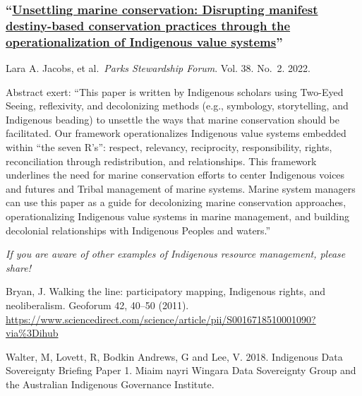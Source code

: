 \documentclass[
]{book}
\begin{document}
\hypertarget{unsettling-marine-conservation-disrupting-manifest-destiny-based-conservation-practices-through-the-operationalization-of-indigenous-value-systems}{%
\subsubsection*{\texorpdfstring{``\href{(https://escholarship.org/uc/item/3sm1f1vq)}{Unsettling marine conservation: Disrupting manifest destiny-based conservation practices through the operationalization of Indigenous value systems}''}{``Unsettling marine conservation: Disrupting manifest destiny-based conservation practices through the operationalization of Indigenous value systems''}}\label{unsettling-marine-conservation-disrupting-manifest-destiny-based-conservation-practices-through-the-operationalization-of-indigenous-value-systems}}

Lara A. Jacobs, et al.~\emph{Parks Stewardship Forum}. Vol. 38. No.~2. 2022.

Abstract exert: ``This paper is written by Indigenous scholars using Two-Eyed Seeing, reflexivity, and decolonizing methods (e.g., symbology, storytelling, and Indigenous beading) to unsettle the ways that marine conservation should be facilitated. Our framework operationalizes Indigenous value systems embedded within ``the seven R's'': respect, relevancy, reciprocity, responsibility, rights, reconciliation through redistribution, and relationships. This framework underlines the need for marine conservation efforts to center Indigenous voices and futures and Tribal management of marine systems. Marine system managers can use this paper as a guide for decolonizing marine conservation approaches, operationalizing Indigenous value systems in marine management, and building decolonial relationships with Indigenous Peoples and waters.''

\emph{If you are aware of other examples of Indigenous resource management, please share!}

Bryan, J. Walking the line: participatory mapping, Indigenous rights, and neoliberalism. Geoforum 42, 40--50 (2011). \url{https://www.sciencedirect.com/science/article/pii/S0016718510001090?via\%3Dihub}

Walter, M, Lovett, R, Bodkin Andrews, G and Lee, V. 2018. Indigenous Data Sovereignty Briefing Paper 1. Miaim nayri Wingara Data Sovereignty Group and the Australian Indigenous Governance Institute.

  
\end{document}
